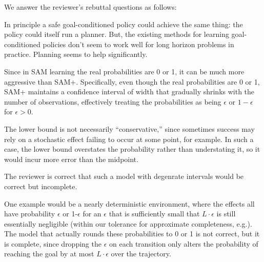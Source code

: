 \documentclass[letterpaper]{article} %
\begin{document}
\noindent We answer the reviewer's rebuttal questions as follows:
\begin{compactenum}

    \item In principle a safe goal-conditioned policy could achieve the same thing: the policy could itself run a planner. But, the existing methods for learning goal-conditioned policies don't seem to work well for long horizon problems in practice. Planning seems to help significantly.
    \item Since in SAM learning the real probabilities are 0 or 1, it can be much more aggressive than SAM+. Specifically, even though the real probabilities are 0 or 1, SAM+ maintains a confidence interval of width that gradually shrinks with the number of observations, effectively treating the probabilities as being $\epsilon$ or $1-\epsilon$ for $\epsilon > 0$.

    \item The lower bound is not necessarily ``conservative,'' since sometimes success may rely on a stochastic effect failing to occur at some point, for example. In such a case, the lower bound overstates the probability rather than understating it, so it would incur more error than the midpoint.
    
    \item The reviewer is correct that such a model with degenrate intervals would be correct but incomplete. 
    
    \item One example would be a nearly deterministic environment, where the effects all have probability $\epsilon$ or 1-$\epsilon$ for an $\epsilon$ that is sufficiently small that $L\cdot\epsilon$ is still essentially negligible (within our tolerance for approximate completeness, e.g.). The model that actually rounds these probabilities to 0 or 1 is not correct, but it is complete, since dropping the $\epsilon$ on each transition only alters the probability of reaching the goal by at most $L\cdot\epsilon$ over the trajectory.


\end{compactenum}
\end{document}
